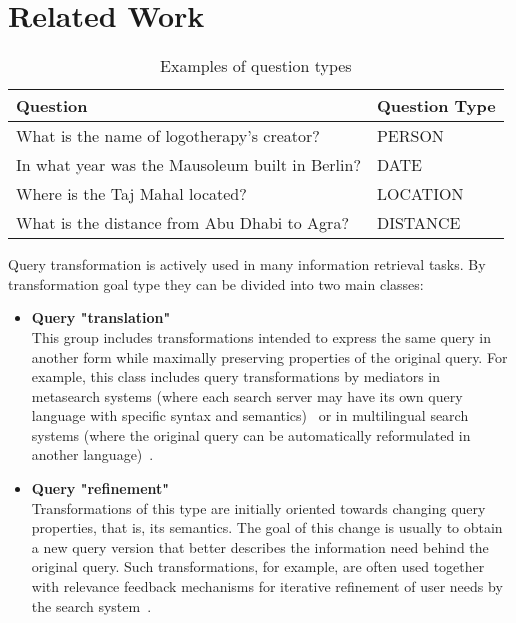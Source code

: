 \documentclass{article}
\begin{document}

\section{Related Work}

\begin{table*}
\begin{center}
\begin{tabular}{|l|l|}
\hline
Question & Question Type \\
\hline
What is the name of logotherapy's creator? & PERSON \\
In what year was the Mausoleum built in Berlin? & DATE \\
Where is the Taj Mahal located? & LOCATION \\
What is the distance from Abu Dhabi to Agra? & DISTANCE \\
\hline
\end{tabular}
\caption{Examples of question types}
\label{table:qtypes}
\end{center}
\end{table*}

Query transformation is actively used in many information retrieval tasks.
By transformation goal type they can be divided into
two main classes:
\begin{itemize}
\item {\bf Query "translation"}\\
This group includes transformations intended to express
the same query in another form while maximally preserving properties of the original query.
For example, this class includes query transformations by mediators in metasearch systems
(where each search server may have its own query language with
specific syntax and semantics)~\cite{admire} or in multilingual search systems
(where the original query can be automatically reformulated in another
language)~\cite{qa:AnswerBus}.

\item {\bf Query "refinement"}\\
Transformations of this type are initially oriented towards changing query properties,
that is, its semantics. The goal of this change is usually
to obtain a new query version that better describes
the information need behind the original query. Such
transformations, for example, are often used together with
relevance feedback mechanisms for iterative refinement
of user needs by the search system~\cite{baeza99modernir}.
\end{itemize}
\end{document}
